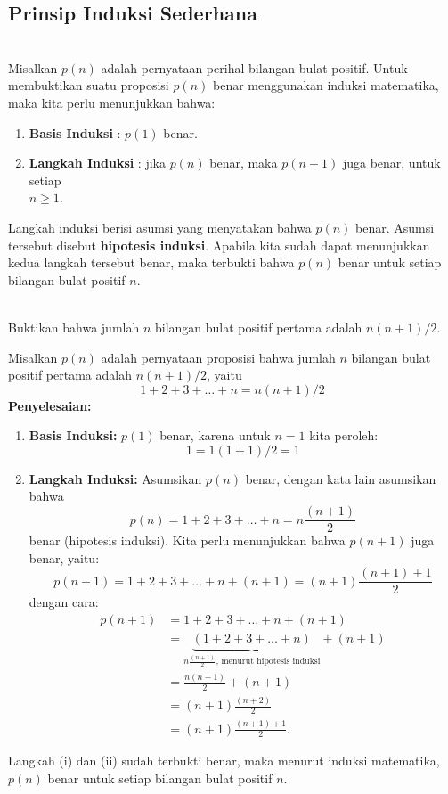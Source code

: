 \documentclass[11pt]{article}
\theoremstyle{definitionstyle}
\theoremstyle{theoremstyle}
\theoremstyle{examplestyle}
\begin{document}
\subsection{Prinsip Induksi Sederhana}
\begin{theorem} \hfill \\
    Misalkan $p(n)$ adalah pernyataan perihal bilangan bulat positif. Untuk membuktikan suatu proposisi $p(n)$ benar menggunakan induksi matematika, maka kita perlu menunjukkan bahwa:
    \begin{enumerate}[left=0pt, label=\roman*), itemsep=1.5pt, topsep=1.5pt, leftmargin=1.5em]
        \item \textbf{Basis Induksi}     : $p(1)$ benar.
        \item \textbf{Langkah Induksi}   : jika $p(n)$ benar, maka $p(n + 1)$ juga benar, untuk setiap\\ $n \ge 1$.
    \end{enumerate}
    Langkah induksi berisi asumsi yang menyatakan bahwa $p(n)$ benar. Asumsi tersebut disebut \textbf{hipotesis induksi}.
    Apabila kita sudah dapat menunjukkan kedua langkah tersebut benar, maka terbukti bahwa $p(n)$ benar untuk setiap bilangan bulat positif $n$.
\end{theorem}

\begin{example} \hfill \\
    Buktikan bahwa jumlah $n$ bilangan bulat positif pertama adalah $n(n+1)/2$. \\
\end{example}
Misalkan $p(n)$ adalah pernyataan proposisi bahwa jumlah $n$ bilangan bulat positif pertama adalah $n(n + 1)/2$, yaitu
$$1 + 2 + 3 + \dots + n = n(n + 1)/2$$
\textbf{Penyelesaian: }
\begin{enumerate}[left=0pt, itemsep=1.5pt, topsep=1.5pt, label=\roman*), leftmargin=1.5em]
    \item \textbf{Basis Induksi:} $p(1)$ benar, karena untuk $n = 1$ kita peroleh:
    $$1 = 1(1 + 1)/2 = 1$$
    \item \textbf{Langkah Induksi:} Asumsikan $p(n)$ benar, dengan kata lain asumsikan bahwa \\
    $$p(n) = 1 + 2 + 3 + \dots + n = n\frac{(n+1)}{2}$$
    benar (hipotesis induksi). Kita perlu menunjukkan bahwa $p(n + 1)$ juga benar, yaitu:
    $$p(n+1) = 1 + 2 + 3 + \dots + n + (n + 1) = (n + 1)\frac{(n + 1) + 1}{2}$$
    dengan cara:
    \begin{align*}
        p(n+1) &= 1 + 2 + 3 + \dots + n + (n + 1) \\
        &= \underbrace{(1 + 2 + 3 + \dots + n)}_{n\frac{(n+1)}{2}\text{, menurut hipotesis induksi}} + (n + 1) \\
        &= \frac{n(n + 1)}{2} + (n + 1)  \\
        &= (n + 1)\frac{(n + 2)}{2} \\
        &= (n + 1)\frac{(n + 1) + 1}{2}.
    \end{align*}
\end{enumerate}
Langkah (i) dan (ii) sudah terbukti benar, maka menurut induksi matematika, $p(n)$ benar untuk setiap bilangan bulat positif $n$. \\
\end{document}
